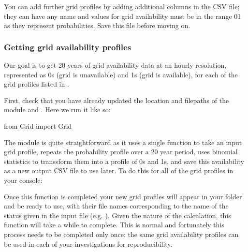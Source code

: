 \documentclass[letterpaper,10pt,english]{sphinxmanual}
\begin{document}
\sphinxAtStartPar
You can add further grid profiles by adding additional columns in the
CSV file; they can have any name and values for grid availability must
be in the range 0\sphinxhyphen{}1 as they represent probabilities. Save this file before
moving on.


\subsubsection{Getting grid availability profiles}
\label{\detokenize{electricity_generation:getting-grid-availability-profiles}}
\sphinxAtStartPar
Our goal is to get 20 years of grid availability data at an hourly
resolution, represented as 0s (grid is unavailable) and 1s (grid is
available), for each of the grid profiles listed in .

\sphinxAtStartPar
First, check that you have already updated the location and filepaths of
the  module and . Here we run it like so:

\begin{sphinxVerbatim}[commandchars=\\\{\}]
from Grid import Grid
\end{sphinxVerbatim}

\sphinxAtStartPar
The  module is quite straightforward as it uses a single function
to take an input grid profile, repeats the probability profile over a 20
year period, uses binomial statistics to transsform them into a profile
of 0s and 1s, and save this availability as a new output CSV file to use
later. To do this for all of the grid profiles  in your console:

\begin{sphinxVerbatim}[commandchars=\\\{\}]
\end{sphinxVerbatim}

\sphinxAtStartPar
Once this function is completed your new grid profiles will appear in
your  folder and be ready to use, with their file names
corresponding to the name of the status given in the input file (e.g.
). Given the nature of the calculation,
this function will take a while to complete. This is normal and
fortunately this process needs to be completed only once: the same grid
availability profiles can be used in each of your investigations for
reproducibility.
\end{document}
